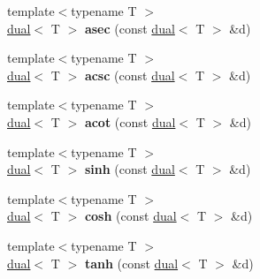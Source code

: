 \begin{DoxyCompactItemize}
\item 
\hypertarget{namespace_d_r_d_s_p_ad87a9540922401a52a9307096773ef75}{{\footnotesize template$<$typename T $>$ }\\\hyperlink{struct_d_r_d_s_p_1_1dual}{dual}$<$ T $>$ {\bfseries asec} (const \hyperlink{struct_d_r_d_s_p_1_1dual}{dual}$<$ T $>$ \&d)}\label{namespace_d_r_d_s_p_ad87a9540922401a52a9307096773ef75}

\item 
\hypertarget{namespace_d_r_d_s_p_a2f59e291a569c6ebf5031dd28e638dca}{{\footnotesize template$<$typename T $>$ }\\\hyperlink{struct_d_r_d_s_p_1_1dual}{dual}$<$ T $>$ {\bfseries acsc} (const \hyperlink{struct_d_r_d_s_p_1_1dual}{dual}$<$ T $>$ \&d)}\label{namespace_d_r_d_s_p_a2f59e291a569c6ebf5031dd28e638dca}

\item 
\hypertarget{namespace_d_r_d_s_p_aa2cda92490ead06ec066a72dd5d8870a}{{\footnotesize template$<$typename T $>$ }\\\hyperlink{struct_d_r_d_s_p_1_1dual}{dual}$<$ T $>$ {\bfseries acot} (const \hyperlink{struct_d_r_d_s_p_1_1dual}{dual}$<$ T $>$ \&d)}\label{namespace_d_r_d_s_p_aa2cda92490ead06ec066a72dd5d8870a}

\item 
\hypertarget{namespace_d_r_d_s_p_ad2113780999bbd3895e3d79b137aac36}{{\footnotesize template$<$typename T $>$ }\\\hyperlink{struct_d_r_d_s_p_1_1dual}{dual}$<$ T $>$ {\bfseries sinh} (const \hyperlink{struct_d_r_d_s_p_1_1dual}{dual}$<$ T $>$ \&d)}\label{namespace_d_r_d_s_p_ad2113780999bbd3895e3d79b137aac36}

\item 
\hypertarget{namespace_d_r_d_s_p_a44964811b291ca1095905668ca95e4e7}{{\footnotesize template$<$typename T $>$ }\\\hyperlink{struct_d_r_d_s_p_1_1dual}{dual}$<$ T $>$ {\bfseries cosh} (const \hyperlink{struct_d_r_d_s_p_1_1dual}{dual}$<$ T $>$ \&d)}\label{namespace_d_r_d_s_p_a44964811b291ca1095905668ca95e4e7}

\item 
\hypertarget{namespace_d_r_d_s_p_a07150f168f0a943b7d3c5cae83dff808}{{\footnotesize template$<$typename T $>$ }\\\hyperlink{struct_d_r_d_s_p_1_1dual}{dual}$<$ T $>$ {\bfseries tanh} (const \hyperlink{struct_d_r_d_s_p_1_1dual}{dual}$<$ T $>$ \&d)}\label{namespace_d_r_d_s_p_a07150f168f0a943b7d3c5cae83dff808}


\end{DoxyCompactItemize}
